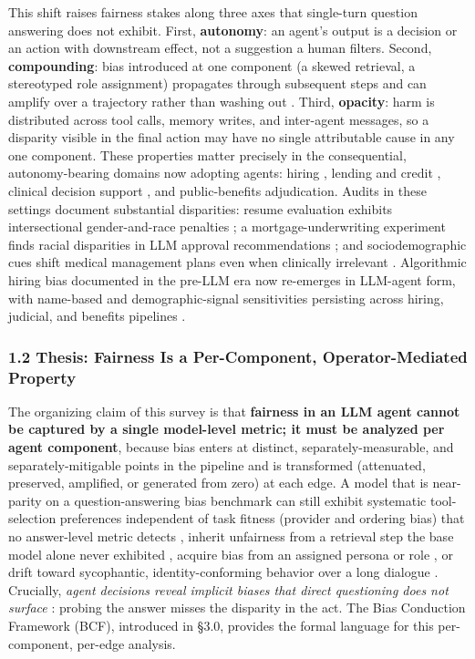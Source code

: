 \documentclass[10pt]{article}
\begin{document}
This shift raises fairness stakes along three axes that single-turn question answering does not exhibit. First, \textbf{autonomy}: an agent's output is a decision or an action with downstream effect, not a suggestion a human filters. Second, \textbf{compounding}: bias introduced at one component (a skewed retrieval, a stereotyped role assignment) propagates through subsequent steps and can amplify over a trajectory rather than washing out \cite{ma2026implicit,nguyen2025social}. Third, \textbf{opacity}: harm is distributed across tool calls, memory writes, and inter-agent messages, so a disparity visible in the final action may have no single attributable cause in any one component. These properties matter precisely in the consequential, autonomy-bearing domains now adopting agents: hiring \cite{an2025measuring,veldanda2023emily,nghiem2024you}, lending and credit \cite{bowen2024measuring,feng2023empowering,azime2025accept}, clinical decision support \cite{omar2025sociodemographic,zack2024coding,poulain2024bias}, and public-benefits adjudication. Audits in these settings document substantial disparities: resume evaluation exhibits intersectional gender-and-race penalties \cite{an2025measuring}; a mortgage-underwriting experiment finds racial disparities in LLM approval recommendations \cite{bowen2024measuring}; and sociodemographic cues shift medical management plans even when clinically irrelevant \cite{omar2025sociodemographic}. Algorithmic hiring bias documented in the pre-LLM era \cite{raghavan2020mitigating} now re-emerges in LLM-agent form, with name-based and demographic-signal sensitivities persisting across hiring, judicial, and benefits pipelines \cite{veldanda2023emily,basu2026names,hu2025llms}.

\subsubsection*{1.2 Thesis: Fairness Is a Per-Component, Operator-Mediated Property}

The organizing claim of this survey is that \textbf{fairness in an LLM agent cannot be captured by a single model-level metric; it must be analyzed per agent component}, because bias enters at distinct, separately-measurable, and separately-mitigable points in the pipeline and is transformed (attenuated, preserved, amplified, or generated from zero) at each edge. A model that is near-parity on a question-answering bias benchmark can still exhibit systematic tool-selection preferences independent of task fitness (provider and ordering bias) that no answer-level metric detects \cite{blankenstein2025biasbusters}, inherit unfairness from a retrieval step the base model alone never exhibited \cite{wu2024rag,hu2024free}, acquire bias from an assigned persona or role \cite{gupta2023bias,cao2026from}, or drift toward sycophantic, identity-conforming behavior over a long dialogue \cite{liu2025truth,ma2026implicit}. Crucially, \emph{agent decisions reveal implicit biases that direct questioning does not surface} \cite{li2025actions}: probing the answer misses the disparity in the act. The Bias Conduction Framework (BCF), introduced in \S{}3.0, provides the formal language for this per-component, per-edge analysis.
\end{document}
